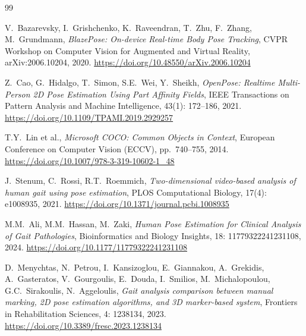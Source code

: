 \begin{thebibliography}{99}


V.\ Bazarevsky, I.\ Grishchenko, K.\ Raveendran, T.\ Zhu, F.\ Zhang, M.\ Grundmann,
\textit{BlazePose: On-device Real-time Body Pose Tracking},
CVPR Workshop on Computer Vision for Augmented and Virtual Reality, arXiv:2006.10204, 2020.
\url{https://doi.org/10.48550/arXiv.2006.10204}

Z.\ Cao, G.\ Hidalgo, T.\ Simon, S.E.\ Wei, Y.\ Sheikh,
\textit{OpenPose: Realtime Multi-Person 2D Pose Estimation Using Part Affinity Fields},
IEEE Transactions on Pattern Analysis and Machine Intelligence, 43(1): 172--186, 2021.
\url{https://doi.org/10.1109/TPAMI.2019.2929257}

T.Y.\ Lin et al.,
\textit{Microsoft COCO: Common Objects in Context},
European Conference on Computer Vision (ECCV), pp.\ 740--755, 2014.
\url{https://doi.org/10.1007/978-3-319-10602-1_48}


J.\ Stenum, C.\ Rossi, R.T.\ Roemmich,
\textit{Two-dimensional video-based analysis of human gait using pose estimation},
PLOS Computational Biology, 17(4): e1008935, 2021.
\url{https://doi.org/10.1371/journal.pcbi.1008935}

M.M.\ Ali, M.M.\ Hassan, M.\ Zaki,
\textit{Human Pose Estimation for Clinical Analysis of Gait Pathologies},
Bioinformatics and Biology Insights, 18: 11779322241231108, 2024.
\url{https://doi.org/10.1177/11779322241231108}

D.\ Menychtas, N.\ Petrou, I.\ Kansizoglou, E.\ Giannakou, A.\ Grekidis, A.\ Gasteratos,
V.\ Gourgoulis, E.\ Douda, I.\ Smilios, M.\ Michalopoulou, G.C.\ Sirakoulis, N.\ Aggeloulis,
\textit{Gait analysis comparison between manual marking, 2D pose estimation algorithms, and 3D marker-based system},
Frontiers in Rehabilitation Sciences, 4: 1238134, 2023.
\url{https://doi.org/10.3389/fresc.2023.1238134}


\end{thebibliography}
